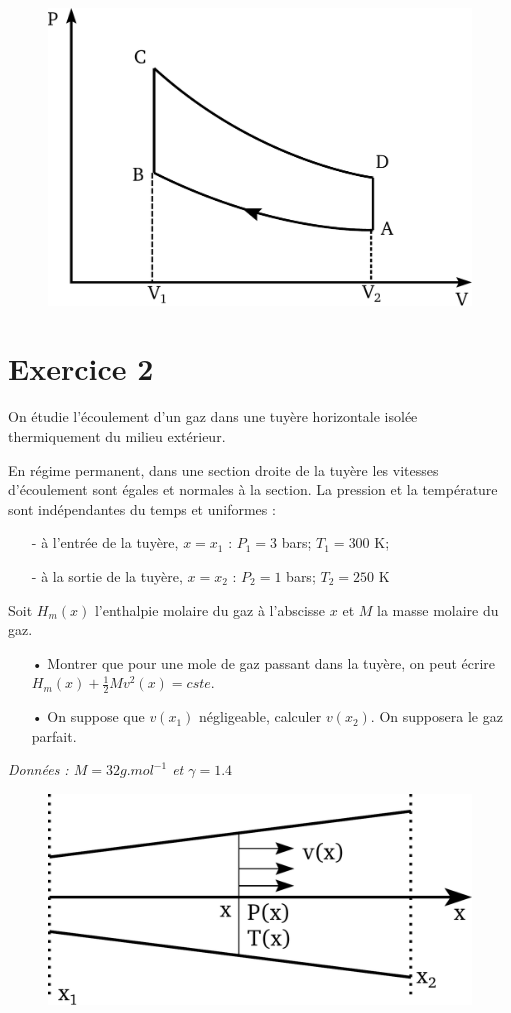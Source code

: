 \documentclass{report}
\begin{document}
\begin{figure}[!h]
\centering
\includegraphics[width=0.3\linewidth]{cycle_beau_rochas.pdf}
\end{figure}



\newpage

\section*{Exercice 2}

On étudie l'écoulement d'un gaz dans une tuyère horizontale isolée thermiquement du milieu extérieur.

En régime permanent, dans une section droite de la tuyère les vitesses d'écoulement sont égales et normales à la section. La pression et la température sont indépendantes du temps et uniformes :
\begin{itemize}
\item[-]à l'entrée de la tuyère, $x=x_{1}$ : $P_{1} = 3$ bars; $T_{1} = 300$ K;
\item[-]à la sortie de la tuyère, $x=x_{2}$ : $P_{2} = 1$ bars; $T_{2} = 250$ K
\end{itemize}

Soit $H_{m}(x)$ l'enthalpie molaire du gaz à l'abscisse $x$ et $M$ la masse molaire du gaz. 

\begin{itemize}
\item[•] Montrer que pour une mole de gaz passant dans la tuyère, on peut écrire $H_{m}(x)+\frac{1}{2}Mv^{2}(x)= cste$.
\item[•] On suppose que $v(x_{1})$ négligeable, calculer $v(x_{2})$. On supposera le gaz parfait. 
\end{itemize}

\textit{Données : $M = 32g.mol^{-1}$ et $\gamma=1.4$}

\begin{figure}[!h]
\centering
\includegraphics[width=0.4\linewidth]{turbine.pdf}
\end{figure}
\end{document}
